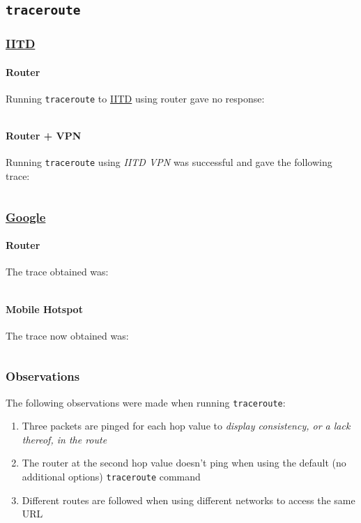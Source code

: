 \documentclass[11pt]{article}
\begin{document}
\subsection{\texttt{traceroute}}

\subsubsection{\href{https://www.iitd.ac.in}{IITD}}
\paragraph{Router} Running \texttt{traceroute} to \href{https://www.iitd.ac.in}{IITD} using router gave no response:
\inputminted[bgcolor=mintedbg]{text}{outputs/traceroute_iitd_novpn}

\paragraph{Router + VPN} Running \texttt{traceroute} using \textit{IITD VPN} was successful and gave the following trace:
\inputminted[bgcolor=mintedbg]{text}{outputs/traceroute_iitd_vpn}

\subsubsection{\href{https://www.google.com}{Google}}

\paragraph{Router} The trace obtained was:
\inputminted[bgcolor=mintedbg]{text}{outputs/traceroute_google_router}

\paragraph{Mobile Hotspot} The trace now obtained was:
\inputminted[bgcolor=mintedbg]{text}{outputs/traceroute_google_hotspot}

\subsubsection{Observations}
The following observations were made when running \texttt{traceroute}:
\begin{enumerate}
    \item Three packets are pinged for each hop value to \textit{display consistency, or a lack thereof, in the route}
    \item The router at the second hop value doesn't ping when using the default (no additional options) \texttt{traceroute} command
    \item Different routes are followed when using different networks to access the same URL
\end{enumerate}
\end{document}
